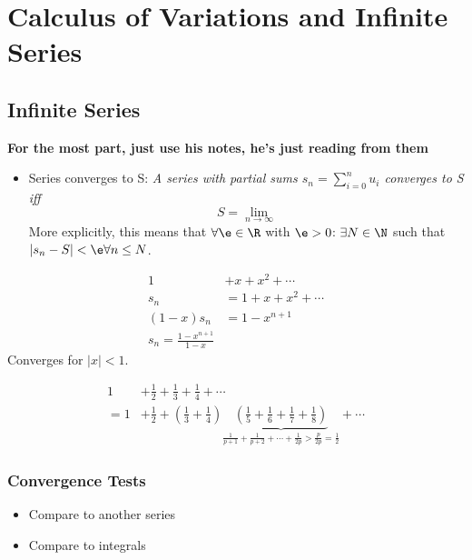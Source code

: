 \documentclass[cplx.tex]{subfiles}
\begin{document}
\part{Calculus of Variations and Infinite Series}
\chapter{Infinite Series}
\textbf{For the most part, just use his notes, he's just reading from them}
\begin{itemize}
    \item Series converges to S: \emph{A series with partial sums $s_n = \sum_{i=0}^n u_i$ converges to S iff}
        \begin{equation}
            S = \lim_{n\to\infty}
        \end{equation}
        More explicitly, this means that $\forall \e \in \R$ with $\e > 0$: $\exists N \in \N$ such that $|s_n - S| < \e \forall n \leq N$.
\end{itemize}

\begin{example}
    \begin{align}
        1 &+ x + x^2 + \cdots \\
        s_n &= 1 + x + x^2 + \cdots \\
        (1-x)s_n &= 1 - x^{n+1} \\
        s_n = \frac{1-x^{n+1}}{1-x}
    \end{align}
    Converges for $|x| < 1$.
\end{example}
\begin{example}
    \begin{align}
        1 &+ \frac12 + \frac13 + \frac14 + \cdots \\
        = 1 &+ \frac12 + \left(\frac13 + \frac14\right)\underbrace{\left(\frac15 + \frac16 + \frac17 + \frac18\right)}_{\frac{1}{p+1} + \frac{1}{p+2} + \cdots + \frac{1}{2p} > \frac{p}{2p} = \frac12} + \cdots
    \end{align}
\end{example}

\section{Convergence Tests}
\begin{itemize}
    \item Compare to another series
    \item Compare to integrals
\end{itemize}
\end{document}
